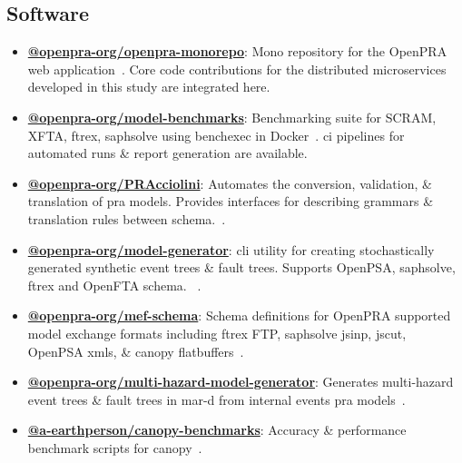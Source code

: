 \subsection{Software}
\begin{itemize}
    \item {\textbf{\href{https://github.com/openpra-org/openpra-monorepo}{@openpra-org/openpra-monorepo}}: Mono repository for the OpenPRA web application~\cite{openpra_initiative_openpra_2024}}. Core code contributions for the distributed microservices developed in this study are integrated here.
    
    \item {\textbf{\href{https://github.com/openpra-org/model-benchmarks}{@openpra-org/model-benchmarks}}: Benchmarking suite for SCRAM, XFTA, \acrshort{ftrex}, \acrshort{saphsolve} using benchexec in Docker~\cite{earthperson_pra_2025}}. \acrlong{ci} pipelines for automated runs \& report generation are available.

    \item {\textbf{\href{https://github.com/openpra-org/PRAcciolini}{@openpra-org/PRAcciolini}}: Automates the conversion, validation, \& translation of \acrshort{pra} models. Provides interfaces for describing grammars \& translation rules between schema.~\cite{earthperson_pracciolini_2024}}.
    
    \item {\textbf{\href{https://github.com/openpra-org/model-generator}{@openpra-org/model-generator}}: \acrshort{cli} utility for creating stochastically generated synthetic event trees \& fault trees. Supports OpenPSA, \acrshort{saphsolve}, \acrshort{ftrex} and OpenFTA schema. ~\cite{earthperson_pra_2022}}.
    
    \item {\textbf{\href{https://github.com/openpra-org/mef-schema}{@openpra-org/mef-schema}}: Schema definitions for OpenPRA supported model exchange formats including \acrshort{ftrex} FTP, \acrshort{saphsolve} \acrshort{jsinp}, \acrshort{jscut}, OpenPSA \acrshort{xml}s, \& canopy flatbuffers~\cite{earthperson_pra_2024}}.
    
    \item {\textbf{\href{https://github.com/openpra-org/multi-hazard-model-generator}{@openpra-org/multi-hazard-model-generator}}: Generates multi-hazard event trees \& fault trees in \acrshort{mar-d} from internal events \acrshort{pra} models~\cite{batikh_multi_2023}}.
    
    \item {\textbf{\href{https://github.com/a-earthperson/canopy-benchmarks}{@a-earthperson/canopy-benchmarks}}: Accuracy \& performance benchmark scripts for canopy~\cite{earthperson_canopy_2025}}.
\end{itemize}